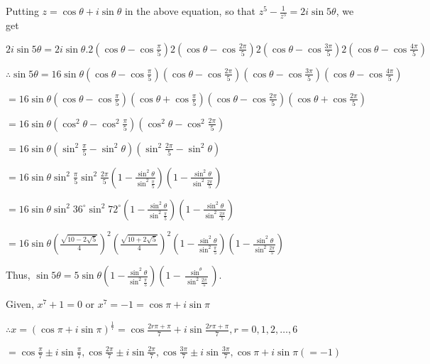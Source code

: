   Putting $z = \cos \theta + i \sin \theta$ in the above equation, so
  that $z^5 - \frac{1}{z^5} = 2i\sin 5\theta$, we get

  $2i\sin 5\theta = 2i\sin\theta.2\left(\cos \theta -
  \cos\frac{\pi}{5}\right)2\left(\cos \theta -
  \cos\frac{2\pi}{5}\right)2\left(\cos \theta -
  \cos\frac{3\pi}{5}\right)2\left(\cos \theta - \cos\frac{4\pi}{5}\right)$

  $\therefore \sin 5\theta = 16 \sin \theta\left(\cos \theta -
  \cos\frac{\pi}{5}\right)\left(\cos \theta -
  \cos\frac{2\pi}{5}\right)\left(\cos \theta -
  \cos\frac{3\pi}{5}\right)\left(\cos \theta - \cos\frac{4\pi}{5}\right)$

  $= 16\sin \theta\left(\cos\theta
  -\cos\frac{\pi}{5}\right)\left(\cos\theta
  +\cos\frac{\pi}{5}\right)\left(\cos\theta
  -\cos\frac{2\pi}{5}\right)\left(\cos\theta +\cos\frac{2\pi}{5}\right)$

  $= 16\sin \theta\left(\cos^2\theta -
  \cos^2\frac{\pi}{5}\right)\left(\cos^2\theta -
  \cos^2\frac{2\pi}{5}\right)$

  $= 16\sin \theta\left(\sin^2\frac{\pi}{5} -
  \sin^2\theta\right)\left(\sin^2\frac{2\pi}{5} - \sin^2\theta\right)$

  $= 16\sin\theta\sin^2\frac{\pi}{5}\sin^2\frac{2\pi}{5}\left(1 -
  \frac{\sin^2\theta}{\sin^2\frac{\pi}{5}}\right)\left(1 -
  \frac{\sin^2\theta}{\sin^2\frac{2\pi}{5}}\right)$

  $= 16\sin\theta\sin^2{36^\circ}\sin^2{72^\circ}\left(1 -
  \frac{\sin^2\theta}{\sin^2\frac{\pi}{5}}\right)\left(1 -
  \frac{\sin^2\theta}{\sin^2\frac{2\pi}{5}}\right)$

  $= 16\sin\theta\left(\frac{\sqrt{10 - 2\sqrt{5}}}{4}\right)^2\left(\frac{\sqrt{10 +
      2\sqrt{5}}}{4}\right)^2\left(1 - \frac{\sin^2\theta}{\sin^2\frac{\pi}{5}}\right)\left(1 -
  \frac{\sin^2\theta}{\sin^2\frac{2\pi}{5}}\right)$

  Thus, $\sin5\theta = 5\sin\theta\left(1 - \frac{\sin^2\theta}{\sin^2\frac{\pi}{5}}\right)\left(1 -
  \frac{\sin^\theta}{\sin^2\frac{2\pi}{5}}\right)$.
\item Given, $x^7 + 1 = 0$ or $x^7 = -1 = \cos\pi + i \sin\pi$

  $\therefore x = \left(\cos\pi + i \sin\pi\right)^{\frac{1}{7}} =
  \cos\frac{2r\pi + \pi}{7} + i \sin \frac{2r\pi + \pi}{7}, r = 0, 1, 2,
  \ldots, 6$

  $= \cos \frac{\pi}{7} \pm i \sin\frac{\pi}{7}, \cos \frac{2\pi}{7} \pm i
  \sin\frac{2\pi}{7}, \cos \frac{3\pi}{7} \pm i \sin\frac{3\pi}{7}, \cos
  \pi + i \sin \pi(= -1)$

